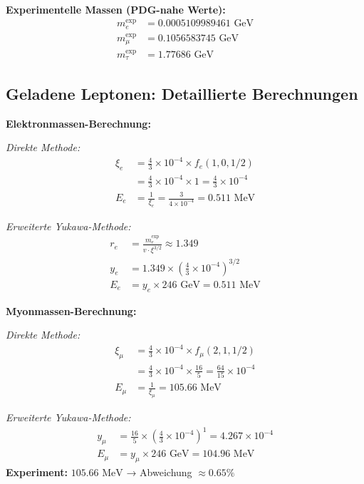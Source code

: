 	\textbf{Experimentelle Massen (PDG-nahe Werte):}
	\begin{align}
		m_e^{\text{exp}} &= 0.0005109989461 \text{ GeV} \\
		m_\mu^{\text{exp}} &= 0.1056583745 \text{ GeV} \\
		m_\tau^{\text{exp}} &= 1.77686 \text{ GeV}
	\end{align}
	
	\subsection{Geladene Leptonen: Detaillierte Berechnungen}
	\label{subsec:charged_leptons_detailed}
	
	\textbf{Elektronmassen-Berechnung:}
	
	\textit{Direkte Methode:}
	\begin{align}
		\xi_e &= \frac{4}{3} \times 10^{-4} \times f_e(1,0,1/2) \\
		&= \frac{4}{3} \times 10^{-4} \times 1 = \frac{4}{3} \times 10^{-4} \\
		E_{e} &= \frac{1}{\xi_e} = \frac{3}{4 \times 10^{-4}} = 0.511 \text{ MeV}
	\end{align}
	
	\textit{Erweiterte Yukawa-Methode:}
	\begin{align}
		r_e &= \frac{m_e^{\text{exp}}}{v \cdot \xi^{3/2}} \approx 1.349 \\
		y_e &= 1.349 \times \left(\frac{4}{3} \times 10^{-4}\right)^{3/2} \\
		E_e &= y_e \times 246 \text{ GeV} = 0.511 \text{ MeV}
	\end{align}
	
	\textbf{Myonmassen-Berechnung:}
	
	\textit{Direkte Methode:}
	\begin{align}
		\xi_\mu &= \frac{4}{3} \times 10^{-4} \times f_\mu(2,1,1/2) \\
		&= \frac{4}{3} \times 10^{-4} \times \frac{16}{5} = \frac{64}{15} \times 10^{-4} \\
		E_{\mu} &= \frac{1}{\xi_\mu} = 105.66 \text{ MeV}
	\end{align}
	
	\textit{Erweiterte Yukawa-Methode:}
	\begin{align}
		y_\mu &= \frac{16}{5} \times \left(\frac{4}{3} \times 10^{-4}\right)^1 = 4.267 \times 10^{-4} \\
		E_\mu &= y_\mu \times 246 \text{ GeV} = 104.96 \text{ MeV}
	\end{align}
	\textbf{Experiment:} $105.66 \text{ MeV}$ → Abweichung $\approx 0.65\%$
	
